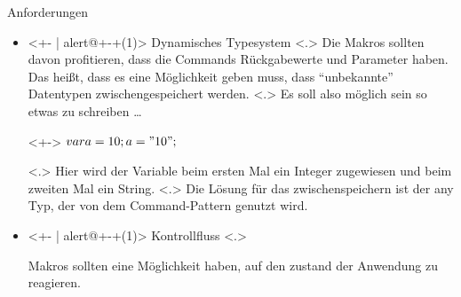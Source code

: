   \begin{frame}{Anforderungen}
    \begin{itemize}
      \item<+- | alert@+-+(1)>
        Dynamisches Typesystem
            \note[item]<.>{
              Die Makros sollten davon profitieren, dass die Commands Rückgabewerte und Parameter haben. Das heißt, dass es eine Möglichkeit geben muss, dass ``unbekannte'' Datentypen zwischengespeichert werden.
            }
            \note[item]<.>{
              Es soll also möglich sein so etwas zu schreiben \ldots
            }
        \begin{uncoverenv}<+->%
          \tabto{4.6cm}
          \myMIn$var a = 10; a = "10";$
        \end{uncoverenv}
            \note[item]<.>{
              Hier wird der Variable  beim ersten Mal ein Integer zugewiesen und beim zweiten Mal ein String.
            }
            \note[item]<.>{
              Die Lösung für das zwischenspeichern ist der any Typ, der von dem Command-Pattern genutzt wird.
            }
      \item<+- | alert@+-+(1)>
        Kontrollfluss
            \note[item]<.>{
              Makros sollten eine Möglichkeit haben, auf den zustand der Anwendung zu reagieren.

}
\end{itemize}
\end{frame}
